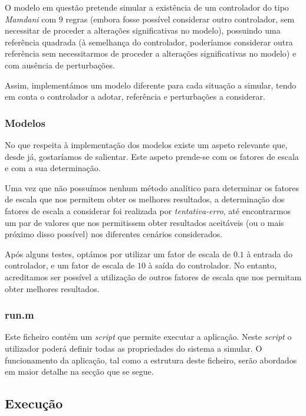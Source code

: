 \documentclass{article}
\begin{document}
O modelo em questão pretende simular a existência de um controlador do tipo \emph{Mamdani} com $9$ regras (embora fosse possível considerar outro controlador, sem necessitar de proceder a alterações significativas no modelo), possuindo uma referência quadrada (à semelhança do controlador, poderíamos considerar outra referência sem necessitarmos de proceder a alterações significativas no modelo) e com ausência de perturbações.

Assim, implementámos um modelo diferente para cada situação a simular, tendo em conta o controlador a adotar, referência e perturbações a considerar.

\subsubsection{Modelos}

No que respeita à implementação dos modelos existe um aspeto relevante que, desde já, gostaríamos de salientar. Este aspeto prende-se com os fatores de escala e com a sua determinação.

Uma vez que não possuímos nenhum método analítico para determinar os fatores de escala que nos permitem obter os melhores resultados, a determinação dos fatores de escala a considerar foi realizada por \emph{tentativa-erro}, até encontrarmos um par de valores que nos permitissem obter resultados aceitáveis (ou o mais próximo disso possível) nos diferentes cenários considerados.

Após alguns testes, optámos por utilizar um fator de escala de $0.1$ à entrada do controlador, e um fator de escala de $10$ à saída do controlador. No entanto, acreditamos ser possível a utilização de outros fatores de escala que nos permitam obter melhores resultados.

\subsubsection{run.m}

Este ficheiro contém um \emph{script} que permite executar a aplicação. Neste \emph{script} o utilizador poderá definir todas as propriedades do sistema a simular. O funcionamento da aplicação, tal como a estrutura deste ficheiro, serão abordados em maior detalhe na secção que se segue.


\subsection{Execução}
\end{document}
